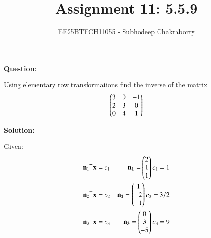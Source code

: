 \documentclass[journal,12pt,onecolumn]{IEEEtran}
\theoremstyle{remark}
\begin{document}

\vspace{3cm}

\title{Assignment 11: 5.5.9}
\author{EE25BTECH11055 - Subhodeep Chakraborty}
\maketitle
\hrulefill
\bigskip

\renewcommand{\thefigure}{\theenumi}
\renewcommand{\thetable}{\theenumi}

\textbf{Question:}\par
Using elementary row transformations find the inverse of the matrix\hfill{}
$$\begin{pmatrix}3&0&-1\\2&3&0\\0&4&1\end{pmatrix}$$
\par
\textbf{Solution:}\par

Given:
\begin{align}
 \mathbf{n_1}^\top\mathbf{x}&=c_1 &\mathbf{n_1} = \begin{pmatrix}2\\1\\1\end{pmatrix} c_1 = 1\\
 \mathbf{n_2}^\top\mathbf{x}&=c_2 &\mathbf{n_2} = \begin{pmatrix}1\\-2\\-1\end{pmatrix} c_2 = 3/2\\
 \mathbf{n_3}^\top\mathbf{x}&=c_3 &\mathbf{n_3} = \begin{pmatrix}0 \\3 \\ -5\end{pmatrix} c_3 = 9
\end{align}
\end{document}
